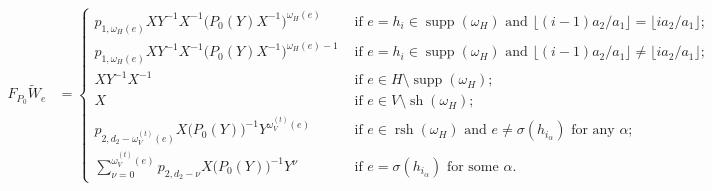 \documentclass{amsart}
\newcommand{\supp}{\operatorname{supp}}
\newcommand{\rsh}{\operatorname{rsh}}
\newcommand{\sh}{\operatorname{sh}}
\begin{document}
\begin{align*}
 F_{P_0}\tilde W_e
 &=\begin{cases}p_{1,\omega_H(e)}XY^{-1}X^{-1}\big(P_0(Y)X^{-1}\big)^{\omega_H(e)} & \text{ if $e=h_i\in\supp(\omega_H)$ and $\lfloor (i-1)a_2/a_1\rfloor=\lfloor ia_2/a_1\rfloor$;}\\ p_{1,\omega_H(e)}XY^{-1}X^{-1}\big(P_0(Y)X^{-1}\big)^{\omega_H(e)-1} & \text{ if $e=h_i\in\supp(\omega_H)$ and $\lfloor (i-1)a_2/a_1\rfloor\ne\lfloor ia_2/a_1\rfloor$;}\\ XY^{-1}X^{-1} & \text{ if $e\in H\setminus\supp(\omega_H)$;}\\ X & \text{ if $e\in V\setminus\sh(\omega_H);$}\\ p_{2,d_2-\omega_V^{(t)}(e)}X\big(P_0(Y)\big)^{-1}Y^{\omega_V^{(t)}(e)} & \text{ if $e\in\rsh(\omega_H)$ and $e\ne\sigma(h_{i_\alpha})$ for any $\alpha$;}\\ \sum\limits_{\nu=0}^{\omega_V^{(t)}(e)}p_{2,d_2-\nu}X\big(P_0(Y)\big)^{-1}Y^\nu & \text{ if $e=\sigma(h_{i_\alpha})$ for some $\alpha$.}\end{cases}\\
\end{align*}

\newpage
\end{document}
